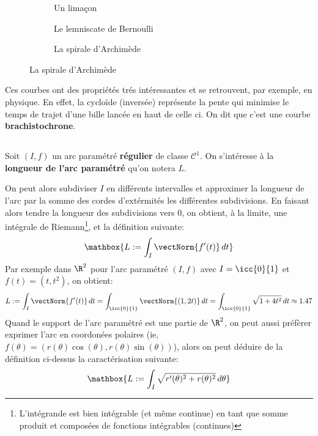 \begin{figure}[h]
\begin{subfigure}{.3\textwidth}
      \caption*{Un limaçon}
   \end{subfigure}\quad
   \begin{subfigure}{.3\textwidth}
      \centering
      \caption*{Le lemniscate de Bernoulli}
   \end{subfigure}\quad
   \begin{subfigure}{.3\textwidth}
      \centering
      \caption*{La spirale d'Archimède}
   \end{subfigure}\quad
\end{figure}

Ces courbes ont des propriétés trés intéressantes et se retrouvent, par exemple, en physique. En effet, la cycloïde (inversée) représente la pente qui minimise le temps de trajet d'une bille lancée en haut de celle ci. On dit que c'est une courbe \textbf{brachistochrone}.

\subsection*{}
Soit \((I, f)\) un arc paramétré \textbf{régulier} de classe \(\mathcal{C}^1\). On s'intéresse à la \textbf{longueur de l'arc paramétré} qu'on notera \(L\).\<

On peut alors subdiviser \(I\) en différents intervalles et approximer la longueur de l'arc par la somme des cordes d'extérmités les différentes subdivisions. En faisant alors tendre la longueur des subdivisions vers 0, on obtient, à la limite, une intégrale de Riemann\footnote[1]{L'intégrande est bien intégrable (et même continue) en tant que somme produit et composées de fonctions intégrables (continues)}, et la définition suivante:
\[
   \mathbox{L := \int_I \vectNorm{f'(t)}\, dt}  
\]
Par exemple dans \(\R^2\) pour l'arc paramétré \((I, f)\) avec \(I = \icc{0}{1}\) et \(f(t) = (t, t^2)\), on obtient:
\[
   L := \int_{I} \vectNorm{f'(t)}\,dt = \int_{\icc{0}{1}} \vectNorm{(1, 2t)}\,dt = \int_{\icc{0}{1}}\sqrt{1 + 4t^2}\,dt \approx 1.47
\]
Quand le support de l'arc paramétré est une partie de \(\R^2\), on peut aussi préfèrer exprimer l'arc en coordonées polaires (ie, \(f(\theta)=(r(\theta)\cos(\theta),r(\theta)\sin(\theta))\)), alors on peut déduire de la définition ci-dessus la caractérisation suivante:
\[
   \mathbox{L := \int_I \sqrt{r'(\theta)^2 + r(\theta)^2}\, d\theta}
\]

